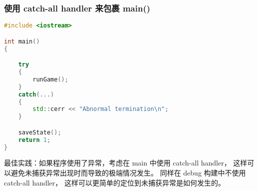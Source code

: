 \documentclass[../../LearnCpp.tex]{subfiles}
\begin{document}
\subsubsection*{使用 catch-all handler 来包裹 main()}

\begin{lstlisting}[language=C++]
#include <iostream>

int main()
{

    try
    {
        runGame();
    }
    catch(...)
    {
        std::cerr << "Abnormal termination\n";
    }

    saveState();
    return 1;
}
\end{lstlisting}

最佳实践：如果程序使用了异常，考虑在 main 中使用 catch-all handler，
这样可以避免未捕获异常出现时而导致的极端情况发生。
同样在 debug 构建中不使用 catch-all handler，
这样可以更简单的定位到未捕获异常是如何发生的。
\end{document}
